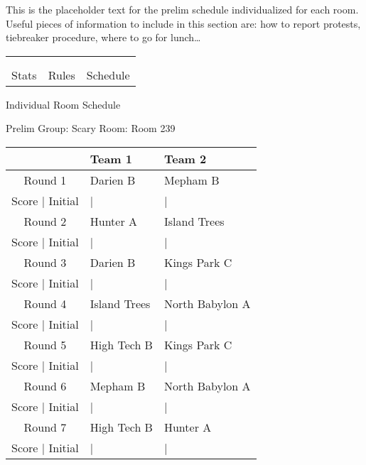\documentclass{article}%
\begin{document}
\vspace*{16pt}%
\linebreak%
This is the placeholder text for the prelim schedule individualized for each room. Useful pieces of information to include in this section are: how to report protests, tiebreaker procedure, where to go for lunch…%
\vspace*{30pt}%
\newline%
%
\begin{tabularx}{\textwidth}{YYY}%
  &  &  \\%
\\%
Stats&Rules&Schedule\\%
\end{tabularx}%
\newpage%
\begin{center}%
\begin{Huge}%
Individual Room Schedule%
\end{Huge}%
\vspace*{16pt}%
\linebreak%
\begin{Large}%
Prelim Group: Scary \hfill Room: Room 239%
\end{Large}%
\end{center}%
%
\begin{tabularx}{\textwidth}{|c|Y|Y|}%
\hline%
&Team 1&Team 2\\%
\hline%
Round 1&Darien B&Mepham B\\%
\hline%
Score | Initial&|&|\\%
\hline%
Round 2&Hunter A&Island Trees\\%
\hline%
Score | Initial&|&|\\%
\hline%
Round 3&Darien B&Kings Park C\\%
\hline%
Score | Initial&|&|\\%
\hline%
Round 4&Island Trees&North Babylon A\\%
\hline%
Score | Initial&|&|\\%
\hline%
Round 5&High Tech B&Kings Park C\\%
\hline%
Score | Initial&|&|\\%
\hline%
Round 6&Mepham B&North Babylon A\\%
\hline%
Score | Initial&|&|\\%
\hline%
Round 7&High Tech B&Hunter A\\%
\hline%
Score | Initial&|&|\\%
\hline%
\end{tabularx}%
\end{document}
